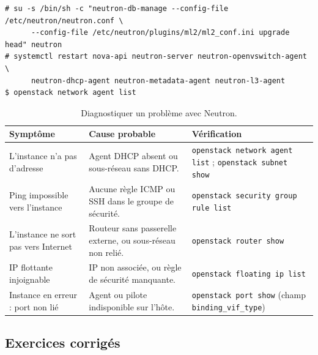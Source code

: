 \par\noindent\begin{minipage}{\linewidth}
\begin{lstlisting}[style=terminal]
# su -s /bin/sh -c "neutron-db-manage --config-file /etc/neutron/neutron.conf \
      --config-file /etc/neutron/plugins/ml2/ml2_conf.ini upgrade head" neutron
# systemctl restart nova-api neutron-server neutron-openvswitch-agent \
      neutron-dhcp-agent neutron-metadata-agent neutron-l3-agent
$ openstack network agent list
\end{lstlisting}
\end{minipage}\par

\begin{table}[!ht]
\centering
\renewcommand{\arraystretch}{1.3}
\begin{tabular}{@{}>{\raggedright\arraybackslash}p{4.4cm}>{\raggedright\arraybackslash}p{5.5cm}>{\raggedright\arraybackslash}p{5.6cm}@{}}
\toprule
\textbf{Symptôme} & \textbf{Cause probable} & \textbf{Vérification} \\
\midrule
L'instance n'a pas d'adresse & Agent DHCP absent ou sous-réseau sans DHCP. & \texttt{openstack network agent list} ; \texttt{openstack subnet show} \\
Ping impossible vers l'instance & Aucune règle ICMP ou SSH dans le groupe de sécurité. & \texttt{openstack security group rule list} \\
L'instance ne sort pas vers Internet & Routeur sans passerelle externe, ou sous-réseau non relié. & \texttt{openstack router show} \\
IP flottante injoignable & IP non associée, ou règle de sécurité manquante. & \texttt{openstack floating ip list} \\
Instance en erreur : port non lié & Agent ou pilote indisponible sur l'hôte. & \texttt{openstack port show} (champ \texttt{binding\_vif\_type}) \\
\bottomrule
\end{tabular}
\caption{Diagnostiquer un problème avec Neutron.}
\label{tab:neu-pannes}
\end{table}

\subsection{Exercices corrigés}\label{sec:neu-exercices}

